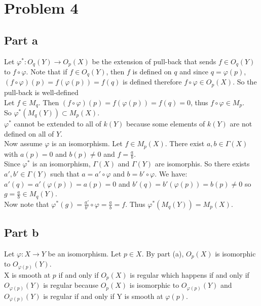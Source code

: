 \documentclass[12pt]{article}
\begin{document}
\clearpage
\section*{Problem 4}
\subsection*{Part a}
Let $\varphi^*: O_q(Y) \rightarrow O_p(X)$ be the extension of pull-back that sends 
$f \in O_q(Y)$ to $f \circ \varphi$. Note that if $f \in O_q(Y)$, then $f$ is defined on $q$
and since $q=\varphi(p)$, $(f \circ \varphi)(p)=f(\varphi(p))=f(q)$ is defined therefore
$f \circ \varphi \in O_p(X)$. So the pull-back is well-defined \\
Let $f \in M_q$. Then $(f \circ \varphi)(p)=f(\varphi(p))=f(q)=0$, thus $f \circ \varphi \in M_p$.
\\
So $\varphi^*(M_q(Y)) \subset M_p(X)$. \\
$\varphi^*$ cannot be extended to all of $k(Y)$ because some elements of $k(Y)$ are not defined on all of $Y$. \\
Now assume $\varphi$ is an isomorphism. Let $f \in M_p(X)$.
There exist $a,b \in \Gamma(X)$ with $a(p)=0$ and $b(p) \not= 0$ and $f = \frac{a}{b}$. \\
Since $\varphi^*$ is an isomorphism, $\Gamma(X)$ and $\Gamma(Y)$ are isomorphis. So there exists $a',b' \in \Gamma(Y)$ such that $a=a' \circ \varphi$ and $b=b' \circ \varphi$. We have: \\
$a'(q)=a'(\varphi(p))=a(p) =0$ and $b'(q)=b'(\varphi(p))=b(p) \not=0$ so
$g=\frac{a}{b} \in M_q(Y)$. \\
Now note that $\varphi^* (g) = \frac{a'}{b'} \circ \varphi = \frac{a}{b}=f$. Thus $\varphi^*(M_q(Y))=M_p(X)$.

\subsection*{Part b}
Let $\varphi:X \rightarrow Y$ be an isomorphism. Let $p \in X$. 
By part (a), $O_p(X)$ is isomorphic to $O_{\varphi(p)}(Y)$. \\
X is smooth at $p$ if and only if $O_p(X)$ is regular which happens if and only if 
$O_{\varphi(p)}(Y)$ is regular because $O_p(X)$ is isomorphic to $O_{\varphi(p)}(Y)$ and
$O_{\varphi(p)}(Y)$ is regular if and only if Y is smooth at $\varphi(p)$. 
\end{document}
